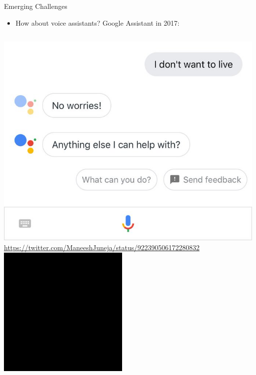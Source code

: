 \documentclass[nobackground,dvipsnames,table]{beamer}
\begin{document}
\begin{frame}{Emerging Challenges}
    \begin{itemize}
        \item How about voice assistants? Google Assistant in 2017:
    \end{itemize}
    \vspace{0.01\textheight}
    \begin{columns}
            \includegraphics[width=\textwidth]{google-assistant-2017-text}
            \tiny
            \url{https://twitter.com/ManeeshJuneja/status/922390506172280832}
            \href{https://drive.google.com/file/d/1c-85YMp_Q-77P-phGZ_S-EI1lzDLfrv-/view}{\includegraphics[width=\textwidth]{google-assistant-video}}
    \end{columns}
\end{frame}
\end{document}
